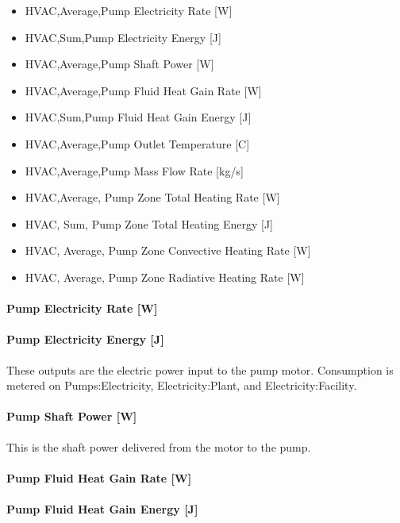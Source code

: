 \begin{itemize}
\item
  HVAC,Average,Pump Electricity Rate {[}W{]}
\item
  HVAC,Sum,Pump Electricity Energy {[}J{]}
\item
  HVAC,Average,Pump Shaft Power {[}W{]}
\item
  HVAC,Average,Pump Fluid Heat Gain Rate {[}W{]}
\item
  HVAC,Sum,Pump Fluid Heat Gain Energy {[}J{]}
\item
  HVAC,Average,Pump Outlet Temperature {[}C{]}
\item
  HVAC,Average,Pump Mass Flow Rate {[}kg/s{]}
\item
  HVAC,Average, Pump Zone Total Heating Rate {[}W{]}
\item
  HVAC, Sum, Pump Zone Total Heating Energy {[}J{]}
\item
  HVAC, Average, Pump Zone Convective Heating Rate {[}W{]}
\item
  HVAC, Average, Pump Zone Radiative Heating Rate {[}W{]}
\end{itemize}

\paragraph{Pump Electricity Rate {[}W{]}}\label{pump-electric-power-w-2}

\paragraph{Pump Electricity Energy {[}J{]}}\label{pump-electric-energy-j-2}

These outputs are the electric power input to the pump motor. Consumption is metered on Pumps:Electricity, Electricity:Plant, and Electricity:Facility.

\paragraph{Pump Shaft Power {[}W{]}}\label{pump-shaft-power-w-2}

This is the shaft power delivered from the motor to the pump.

\paragraph{Pump Fluid Heat Gain Rate {[}W{]}}\label{pump-fluid-heat-gain-rate-w-2}

\paragraph{Pump Fluid Heat Gain Energy {[}J{]}}\label{pump-fluid-heat-gain-energy-j-2}

